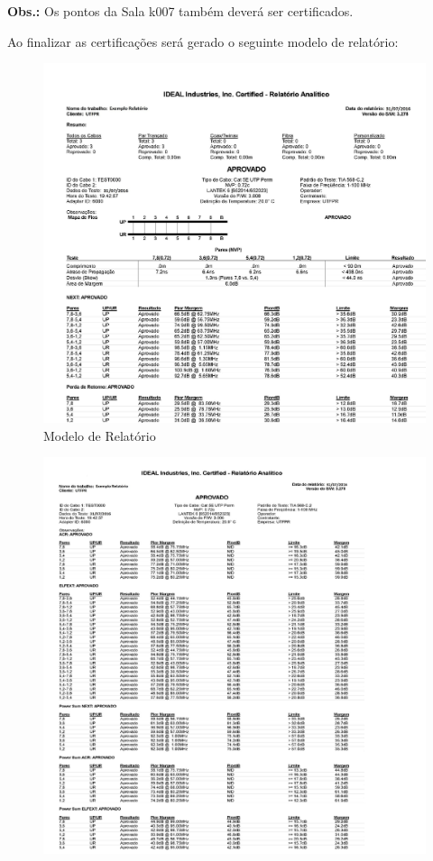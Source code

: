 \documentclass[	DIV=calc,%
							paper=a4,%
							fontsize=12pt,%
							onecolumn]{scrartcl}	 					%
\begin{document}
\textbf{Obs.:} Os pontos da Sala k007 também deverá ser certificados.


Ao finalizar as certificações será gerado o seguinte modelo de relatório:

\begin{figure}[!h]
	\centering
	\caption{Modelo de Relatório}
	\includegraphics{relat_1}
\end{figure}
\begin{figure}[!h]
	\centering
	\includegraphics{relat_2}
\end{figure}
\end{document}
